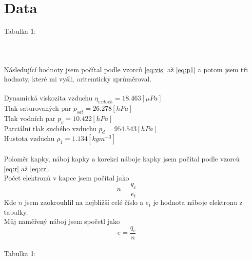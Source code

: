 \documentclass{article}
\begin{document}
\section{Data}
\footnotesize{Tabulka 1:}\\
\\
\normalsize{
}
\\
\vspace{1em}
\\
Následující hodnoty jsem počítal podle vzorců \ref{eq:vis} až \ref{eq:p1} a potom jsem
tři hodnoty, které mi vyšli, aritemticky zprůměroval.\\\\
Dynamická viskozita vzduchu $\eta_{vzduch} = 18.463 [\mu Pa]$ \\
Tlak saturovaných par $p_{sat} = 26.278 [hPa]$ \\
Tlak vodních par $p_{v} = 10.422 [hPa]$ \\
Parciální tlak suchého vzduchu $p_{d} = 954.543 [hPa]$ \\
Hustota vzduchu $\rho_{1} = 1.134 [kg m^{-3}]$ \\
\\
Poloměr kapky, náboj kapky a korekci náboje kapky jsem počítal podle vzorců
\ref{eq:r} až \ref{eq:cr}.\\
Počet elektronů v kapce jsem počítal jako
$$n = \frac{q_{c}}{e_{t}}$$
Kde $n$ jsem zaokrouhlil na nejbližší celé číslo a $e_{t}$ je hodnota náboje elektronu z tabulky.\\
Můj naměřený náboj jsem spočetl jako
$$e = \frac{q_{c}}{n}$$
\\
\footnotesize{Tabulka 1:}\\
\\
\normalsize{
}
\end{document}
